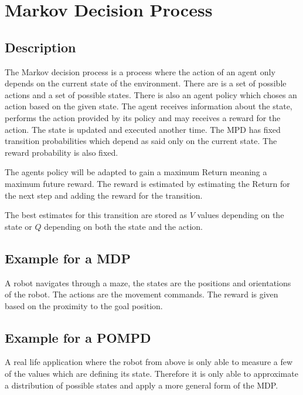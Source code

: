 \documentclass[a4paper, 11pt]{article}
\begin{document}
\section{Markov Decision Process}
\subsection{Description}
The Markov decision process is a process where the action of an agent only depends on the current state of the environment.
There are is a set of possible actions and a set of possible states. There is also an agent policy which choses an action based on the given state.
The agent receives information about the state, performs the action provided by its policy and may receives a reward for the action. The state is updated and executed another time.
The MPD has fixed transition probabilities which depend as said only on the current state.
The reward probability is also fixed.

The agents policy will be adapted to gain a maximum Return meaning a maximum future reward.
The reward is estimated by estimating the Return for the next step and adding the reward for the transition.

The best estimates for this transition are stored as $V$ values depending on the state or $Q$ depending on both the state and the action.

\subsection{Example for a MDP}

A robot navigates through a maze, the states are the positions and orientations of the robot.
The actions are the movement commands. The reward is given based on the proximity to the goal position.


\subsection{Example for a POMPD}

A real life application where the robot from above is only able to measure a few of the values which are defining its state.
Therefore it is only able to approximate a distribution of possible states and apply a more general form of the MDP.
\end{document}
